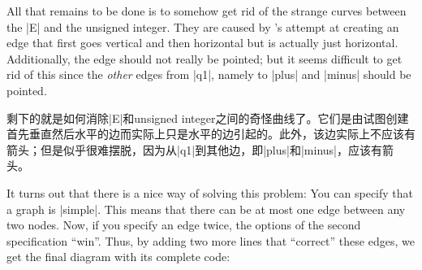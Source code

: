 %
\begin{codeexample}[
    preamble={\usetikzlibrary{arrows.meta,graphs,shapes.misc}},
    pre={\tikzset{
    skip loop/.style={to path={-- ++(0,##1) -| (\tikztotarget)}},
    hv path/.style={to path={-| (\tikztotarget)}},
    vh path/.style={to path={|- (\tikztotarget)}},
}},
]
\end{codeexample}

All that remains to be done is to somehow get rid of the strange curves between
the |E| and the unsigned integer. They are caused by \tikzname's attempt at
creating an edge that first goes vertical and then horizontal but is actually
just horizontal. Additionally, the edge should not really be pointed; but it
seems difficult to get rid of this since the \emph{other} edges from |q1|,
namely to |plus| and |minus| should be pointed.

剩下的就是如何消除|E|和unsigned integer之间的奇怪曲线了。它们是由\tikzname 试图创建首先垂直然后水平的边而实际上只是水平的边引起的。此外，该边实际上不应该有箭头；但是似乎很难摆脱，因为从|q1|到其他边，即|plus|和|minus|，应该有箭头。

It turns out that there is a nice way of solving this problem: You can specify
that a graph is |simple|. This means that there can be at most one edge between
any two nodes. Now, if you specify an edge twice, the options of the second
specification ``win''. Thus, by adding two more lines that ``correct'' these
edges, we get the final diagram with its complete code:

